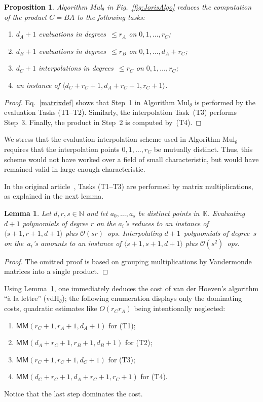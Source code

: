 \documentclass{sig-alt-full}
\newcommand{\Tx}{\theta}
\newcommand{\bigO}{{\mathcal{O}}}
\newcommand{\MM}{\mathsf{MM}}
\def\MMul#1#2#3{\langle #1,#2,#3 \rangle}
\newcommand{\bK}{\mathbb{K}}
\newcommand{\bN}{\mathbb{N}}
\newtheorem{lemma}{Lemma}
\newtheorem{proposition}{Proposition}
\begin{document}
\begin{proposition}
Algorithm \textsf{Mul}${}_\Tx$ in Fig.~\ref{fig:JorisAlgo} reduces the computation of the product $C=BA$ to the following tasks:
\begin{enumerate}
\item[\emph{(T1)}\/] $d_A+1$ evaluations in degrees\/~$\leq r_A$ on\/ $0,1,\ldots,r_C$;
\item[\emph{(T2)}\/] $d_B+1$ evaluations in degrees\/~$\leq r_B$ on\/ $0,1,\ldots,d_A+r_C$;
\item[\emph{(T3)}\/] $d_C+1$ interpolations in degrees\/~$\leq r_C$ on\/ $0,1,\ldots,r_C$;
\item[\emph{(T4)}\/] an instance of\/ $\MMul{d_C+r_C+1}{d_A+r_C+1}{r_C+1}$.
\end{enumerate}
\end{proposition}

\begin{proof} Eq.~\eqref{matrixdef} shows that Step~1 in Algorithm \textsf{Mul}${}_\Tx$ is performed by the evaluation Tasks (T1--T2).
Similarly, the interpolation Task~(T3) performs Step~3.
Finally, the product in Step~2 is computed by~(T4).
\end{proof}

We stress that the evaluation-interpolation scheme used in Algorithm \textsf{Mul}${}_\Tx$ requires that the interpolation points $0,1,\ldots,r_C$ be mutually distinct.
Thus, this scheme would not have worked over a field of small characteristic, but would have remained valid in large enough characteristic. 


In the original article~\cite{vdHoeven02}, Tasks (T1--T3) are performed by matrix multiplications, as explained in the next lemma.

\begin{lemma} \label{evaluationVand}
Let $d,r,s\in\bN$ and let $a_0,\ldots,a_s$ be distinct points in\/~$\bK$.
Evaluating $d+1$  polynomials of degree $r$ on the $a_i$'s reduces to an instance of\/ $\MMul{s+1}{r+1}{d+1}$ plus $\bigO(sr)$~ops.
Interpolating $d+1$~polynomials of degree~$s$ on the~$a_i$'s amounts to an instance of\/ $\MMul{s+1}{s+1}{d+1}$ plus $\bigO(s^2)$~ops.
\end{lemma}

\begin{proof}
The omitted proof is based on grouping multiplications by Vandermonde matrices into a single product.
\end{proof}


Using Lemma~\ref{evaluationVand}, one immediately deduces the cost of van der Hoeven's algorithm  ``\`a la lettre'' (\textsf{vdH${}_\Tx$});
the following enumeration displays only the dominating costs, quadratic estimates like $O(r_C r_A)$ being intentionally neglected:
\begin{enumerate}
\item $\MM(r_C+1,r_A+1, d_A+1)$ for (T1);
\item  $\MM(d_A+r_C+1,r_B+1,d_B+1)$ for (T2);
\item  $\MM(r_C+1,r_C+1,d_C+1)$ for (T3);
\item  $\MM(d_C+r_C+1,d_A+r_C+1,r_C+1)$ for (T4).
\end{enumerate}
Notice that the last step dominates the cost.
\end{document}
